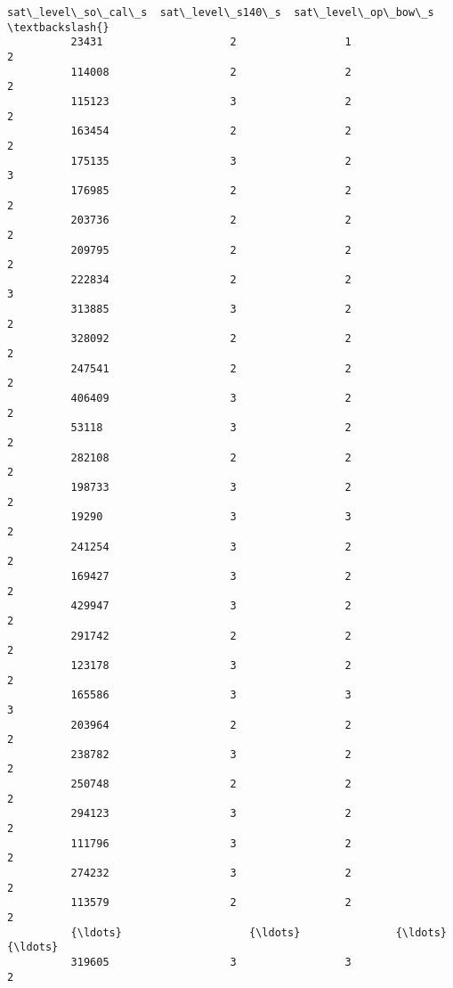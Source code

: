 \documentclass[11pt]{article}
\begin{document}
\begin{Verbatim}[commandchars=\\\{\}]
                  sat\_level\_so\_cal\_s  sat\_level\_s140\_s  sat\_level\_op\_bow\_s  \textbackslash{}
          23431                    2                 1                   2   
          114008                   2                 2                   2   
          115123                   3                 2                   2   
          163454                   2                 2                   2   
          175135                   3                 2                   3   
          176985                   2                 2                   2   
          203736                   2                 2                   2   
          209795                   2                 2                   2   
          222834                   2                 2                   3   
          313885                   3                 2                   2   
          328092                   2                 2                   2   
          247541                   2                 2                   2   
          406409                   3                 2                   2   
          53118                    3                 2                   2   
          282108                   2                 2                   2   
          198733                   3                 2                   2   
          19290                    3                 3                   2   
          241254                   3                 2                   2   
          169427                   3                 2                   2   
          429947                   3                 2                   2   
          291742                   2                 2                   2   
          123178                   3                 2                   2   
          165586                   3                 3                   3   
          203964                   2                 2                   2   
          238782                   3                 2                   2   
          250748                   2                 2                   2   
          294123                   3                 2                   2   
          111796                   3                 2                   2   
          274232                   3                 2                   2   
          113579                   2                 2                   2   
          {\ldots}                    {\ldots}               {\ldots}                 {\ldots}   
          319605                   3                 3                   2   

\end{Verbatim}
\end{document}
